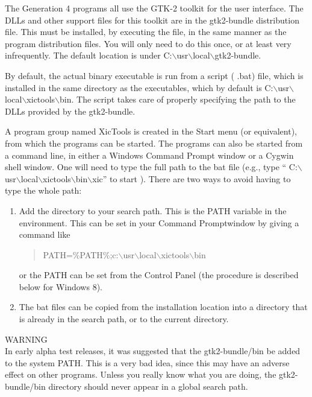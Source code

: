\begin{itemize}
The Generation 4 programs all use the GTK-2 toolkit for the user
interface.  The DLLs and other support files for this toolkit are in
the {\vt gtk2-bundle} distribution file.  This must be installed, by
executing the file, in the same manner as the program distribution
files.  You will only need to do this once, or at least very
infrequently.  The default location is under {\vt
C:$\backslash$usr$\backslash$local$\backslash$gtk2-bundle}.

By default, the actual binary executable is run from a script ({\vt
.bat}) file, which is installed in the same directory as the
executables, which by default is {\vt
C:$\backslash$usr$\backslash$local$\backslash$xictools$\backslash$bin}. 
The script takes care of properly specifying the path to the DLLs
provided by the gtk2-bundle.

A program group named {\vt XicTools} is created in the {\vt Start}
menu (or equivalent), from which the programs can be started.  The
programs can also be started from a command line, in either a Windows
{\cb Command Prompt} window or a Cygwin shell window.  One will need
to type the full path to the bat file (e.g., type ``{\vt
C:$\backslash$usr$\backslash$local$\backslash$xictools$\backslash$bin$\backslash$xic}''
to start {\Xic}).  There are two ways to avoid having to type the
whole path:

\begin{enumerate}
\item{Add the directory to your search path.  This is the {\vt PATH}
variable in the environment.  This can be set in your {\cb Command
Prompt}window by giving a command like
\begin{quote}
 \vt PATH=\%PATH\%;c:$\backslash$usr$\backslash$local$\backslash$xictools$\backslash$bin
\end{quote}
or the {\vt PATH} can be set from the {\cb Control Panel} (the
procedure is described below for Windows 8).}

\item{The {\vt bat} files can be copied from the installation location
into a directory that is already in the search path, or to the current
directory.}
\end{enumerate}

WARNING\\
In early alpha test releases, it was suggested that the {\vt
gtk2-bundle/bin} be added to the system {\vt PATH}.  This is a very
bad idea, since this may have an adverse effect on other programs. 
Unless you really know what you are doing, the {\vt gtk2-bundle/bin}
directory should never appear in a global search path.


\end{itemize}
